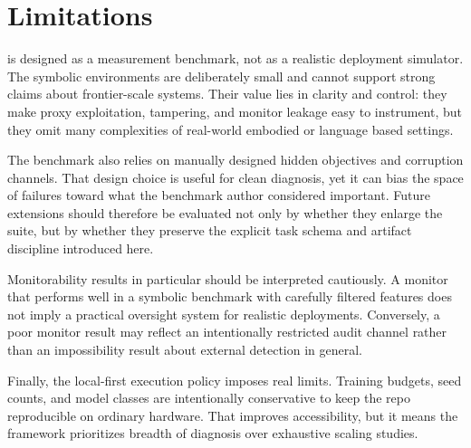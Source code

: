 \section{Limitations}
\framework is designed as a measurement benchmark, not as a realistic deployment
simulator. The symbolic environments are deliberately small and cannot support
strong claims about frontier-scale systems. Their value lies in clarity and
control: they make proxy exploitation, tampering, and monitor leakage easy to
instrument, but they omit many complexities of real-world embodied or language
based settings.

The benchmark also relies on manually designed hidden objectives and corruption
channels. That design choice is useful for clean diagnosis, yet it can bias the
space of failures toward what the benchmark author considered important. Future
extensions should therefore be evaluated not only by whether they enlarge the
suite, but by whether they preserve the explicit task schema and artifact
discipline introduced here.

Monitorability results in particular should be interpreted cautiously. A monitor
that performs well in a symbolic benchmark with carefully filtered features does
not imply a practical oversight system for realistic deployments. Conversely, a
poor monitor result may reflect an intentionally restricted audit channel rather
than an impossibility result about external detection in general.

Finally, the local-first execution policy imposes real limits. Training budgets,
seed counts, and model classes are intentionally conservative to keep the repo
reproducible on ordinary hardware. That improves accessibility, but it means the
framework prioritizes breadth of diagnosis over exhaustive scaling studies.
